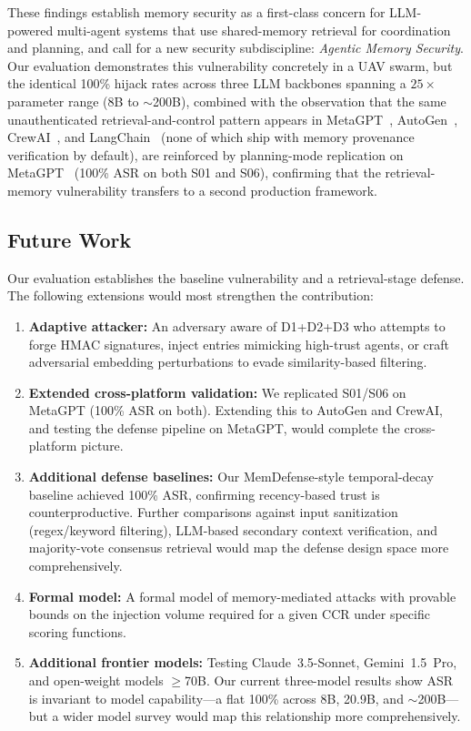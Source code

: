 \documentclass[conference]{IEEEtran}
\begin{document}
These findings establish memory security as a first-class concern for LLM-powered multi-agent systems that use shared-memory retrieval for coordination and planning, and call for a new security subdiscipline: \textit{Agentic Memory Security}. Our evaluation demonstrates this vulnerability concretely in a UAV swarm, but the identical 100\% hijack rates across three LLM backbones spanning a $25\times$ parameter range (8B to $\sim$200B), combined with the observation that the same unauthenticated retrieval-and-control pattern appears in MetaGPT~\cite{metagpt}, AutoGen~\cite{autogen}, CrewAI~\cite{crewai}, and LangChain~\cite{langchain} (none of which ship with memory provenance verification by default), are reinforced by planning-mode replication on MetaGPT~\cite{metagpt} (100\% ASR on both S01 and S06), confirming that the retrieval-memory vulnerability transfers to a second production framework.

\subsection*{Future Work}
Our evaluation establishes the baseline vulnerability and a retrieval-stage defense. The following extensions would most strengthen the contribution:
\begin{enumerate}
  \item \textbf{Adaptive attacker:} An adversary aware of D1+D2+D3 who attempts to forge HMAC signatures, inject entries mimicking high-trust agents, or craft adversarial embedding perturbations to evade similarity-based filtering.
  \item \textbf{Extended cross-platform validation:} We replicated S01/S06 on MetaGPT (100\% ASR on both). Extending this to AutoGen and CrewAI, and testing the defense pipeline on MetaGPT, would complete the cross-platform picture.
  \item \textbf{Additional defense baselines:} Our MemDefense-style temporal-decay baseline achieved 100\% ASR, confirming recency-based trust is counterproductive. Further comparisons against input sanitization (regex/keyword filtering), LLM-based secondary context verification, and majority-vote consensus retrieval would map the defense design space more comprehensively.
  \item \textbf{Formal model:} A formal model of memory-mediated attacks with provable bounds on the injection volume required for a given CCR under specific scoring functions.
  \item \textbf{Additional frontier models:} Testing Claude~3.5-Sonnet, Gemini~1.5~Pro, and open-weight models $\geq$70B. Our current three-model results show ASR is invariant to model capability---a flat 100\% across 8B, 20.9B, and $\sim$200B---but a wider model survey would map this relationship more comprehensively.
\end{enumerate}
\end{document}
